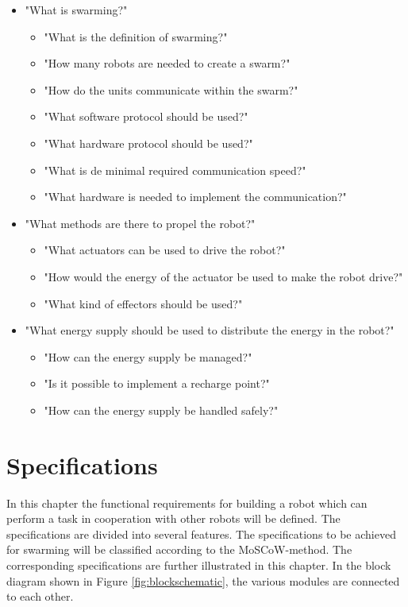 \documentclass[10pt,a4paper]{article}
\begin{document}
\begin{itemize}

    \item "What is swarming?"
    \begin{itemize}
        \item "What is the definition of swarming?"
        \item "How many robots are needed to create a swarm?"
        \item "How do the units communicate within the swarm?"
    \end{itemize}    
    \begin{itemize}
        \item "What software protocol should be used?"
        \item "What hardware protocol should be used?"
        \item "What is de minimal required communication speed?"
        \item "What hardware is needed to implement the communication?"
    \end{itemize}
    \item "What methods are there to propel the robot?"
    \begin{itemize}
        \item "What actuators can be used to drive the robot?"
        \item "How would the energy of the actuator be used to make the robot drive?"
        \item "What kind of effectors should be used?"
    \end{itemize}
    \item "What energy supply should be used to distribute the energy in the robot?"
    \begin{itemize}
        \item "How can the energy supply be managed?"
        \item "Is it possible to implement a recharge point?"
        \item "How can the energy supply be handled safely?"
    \end{itemize}
\end{itemize}
\newpage

\section{Specifications}
In this chapter the functional requirements for building a robot which can perform a task in cooperation with other robots will be defined. The specifications are divided into several features. The specifications to be achieved for swarming will be classified according to the MoSCoW-method. The corresponding specifications are further illustrated in this chapter. In the block diagram shown in Figure  \ref{fig:blockschematic}, the various modules are connected to each other.
\end{document}
